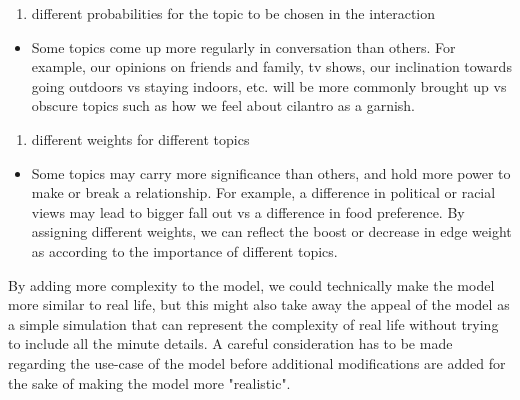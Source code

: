 \documentclass[11pt]{article}
\providecommand{\tightlist}{%
      \setlength{\itemsep}{0pt}\setlength{\parskip}{0pt}}
\begin{document}
\begin{enumerate}
\def\labelenumi{\alph{enumi})}
\tightlist
\item
  different probabilities for the topic to be chosen in the interaction
\end{enumerate}

\begin{itemize}
\tightlist
\item
  Some topics come up more regularly in conversation than others. For
  example, our opinions on friends and family, tv shows, our inclination
  towards going outdoors vs staying indoors, etc. will be more commonly
  brought up vs obscure topics such as how we feel about cilantro as a
  garnish.
\end{itemize}

\begin{enumerate}
\def\labelenumi{\alph{enumi})}
\setcounter{enumi}{1}
\tightlist
\item
  different weights for different topics
\end{enumerate}

\begin{itemize}
\tightlist
\item
  Some topics may carry more significance than others, and hold more
  power to make or break a relationship. For example, a difference in
  political or racial views may lead to bigger fall out vs a difference
  in food preference. By assigning different weights, we can reflect the
  boost or decrease in edge weight as according to the importance of
  different topics.
\end{itemize}

By adding more complexity to the model, we could technically make the
model more similar to real life, but this might also take away the
appeal of the model as a simple simulation that can represent the
complexity of real life without trying to include all the minute
details. A careful consideration has to be made regarding the use-case
of the model before additional modifications are added for the sake of
making the model more "realistic".


    
    
    
    
\end{document}
